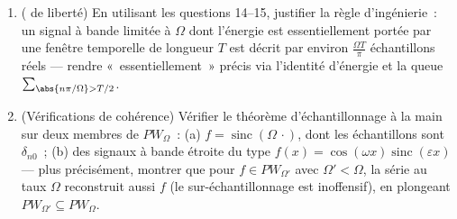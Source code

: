 \begin{problem}[{Problème du week-end --- $\partial_tu =
\partial^2_{xx}u$, résolue de bout en bout}]
\begin{enumerate}[resume]
        différents peuvent partager tous les échantillons~:
        l'effet stroboscopique des roues de chariot,
        mathématisé.
  \item ( de liberté) En utilisant les questions 14--15,
        justifier la règle d'ingénierie~: un signal à bande
        limitée à $\Omega$ dont l'énergie est essentiellement
        portée par une fenêtre temporelle de longueur $T$ est
        décrit par environ $\frac{\Omega T}\pi$ échantillons
        réels --- rendre «~essentiellement~» précis via
        l'identité d'énergie et la queue
        $\sum_{\abs{n\pi/\Omega} > T/2}$.
  \item (Vérifications de cohérence) Vérifier le théorème
        d'échantillonnage à la main sur deux membres de
        $PW_\Omega$~: (a) $f = \operatorname{sinc}(\Omega
        \,\cdot)$, dont les échantillons sont $\delta_{n0}$~;
        (b) des signaux à bande étroite du type $f(x) =
        \cos(\omega x)\operatorname{sinc}(\varepsilon x)$ ---
        plus précisément, montrer que pour $f \in
        PW_{\Omega'}$ avec $\Omega' < \Omega$, la série au
        taux $\Omega$ reconstruit aussi $f$ (le
        sur-échantillonnage est inoffensif), en plongeant
        $PW_{\Omega'} \subseteq PW_\Omega$.
\end{enumerate}


\end{problem}
